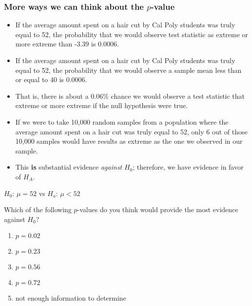 \begin{frame}
\frametitle{More ways we can think about the $p$-value}
\begin{itemize}
    \item
    If the average amount spent on a hair cut by Cal Poly students was truly equal to 52, the probability that we would observe test statistic as extreme or more extreme than -3.39 is 0.0006. \\
    \item
    If the average amount spent on a hair cut by Cal Poly students was truly equal to 52, the probability that we would observe a sample mean less than or equal to 40 is 0.0006. \\
    \item
    That is, there is about a 0.06\% chance we would observe a test statistic that extreme or more extreme if the null hypothesis were true.\\
    \item If we were to take 10,000 random samples from a population where the average amount spent on a hair cut was truly equal to 52, only 6 out of those 10,000 samples would have results as extreme as the one we observed in our sample.
    \item
    This \textbf{is} substantial evidence \emph{against} $H_0$; therefore, we have evidence in favor of $H_{A}$.
\end{itemize}
\end{frame}



\begin{frame}
$H_0$: $\mu=52$ vs $H_a$: $\mu < 52$\\
\begin{clicker}{Which of the following $p$-values do you think would provide the most evidence against $H_0$?}
\begin{enumerate}
    \item
    $p=0.02$
    \item
    $p=0.23$
    \item
    $p=0.56$
    \item
    $p=0.72$
    \item
    not enough information to determine
\end{enumerate}
\end{clicker}
\end{frame}



